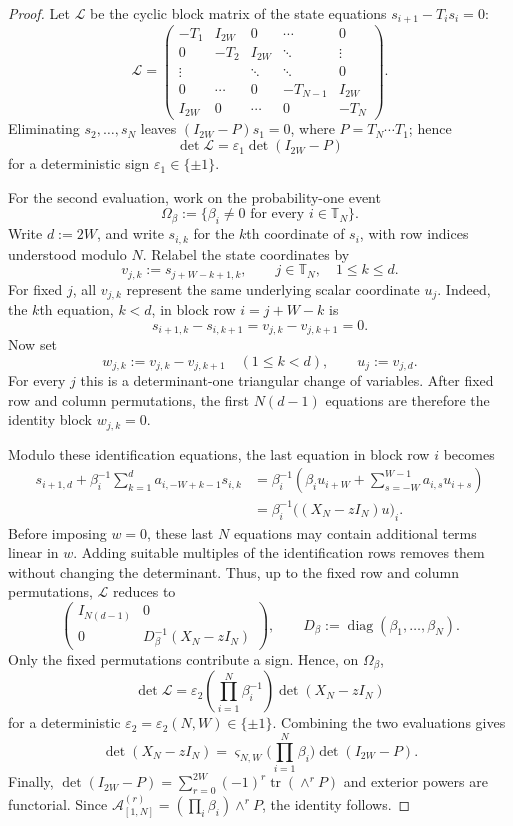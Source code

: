 \documentclass[11pt,reqno]{amsart}
\numberwithin{equation}{section}
\theoremstyle{definition}
\theoremstyle{remark}
\newcommand{\T}{\mathbb T}
\newcommand{\1}{\mathbf 1}
\DeclareMathOperator{\tr}{tr}
\begin{document}
\begin{proof}
Let $\mathscr L$ be the cyclic block matrix of the state equations
$s_{i+1}-T_is_i=0$:
\[
 \mathscr L=
 \begin{pmatrix}
 -T_1&I_{2W}&0&\cdots&0\\
 0&-T_2&I_{2W}&\ddots&\vdots\\
 \vdots&&\ddots&\ddots&0\\
 0&\cdots&0&-T_{N-1}&I_{2W}\\
 I_{2W}&0&\cdots&0&-T_N
 \end{pmatrix}.
\]
Eliminating $s_2,\ldots,s_N$ leaves
$(I_{2W}-P)s_1=0$, where $P=T_N\cdots T_1$; hence
\begin{equation}\label{eq:block-state-determinant}
 \det\mathscr L=\varepsilon_1\det(I_{2W}-P)
\end{equation}
for a deterministic sign $\varepsilon_1\in\{\pm 1\}$.

For the second evaluation, work on the probability-one event
\[
 \Omega_\beta:=\{\beta_i\ne0\text{ for every }i\in\T_N\}.
\]
Write $d:=2W$, and write $s_{i,k}$ for the $k$th coordinate of $s_i$, with
row indices understood modulo $N$.  Relabel the state coordinates by
\[
 v_{j,k}:=s_{j+W-k+1,k},
 \qquad j\in\T_N,\quad 1\le k\le d.
\]
For fixed $j$, all $v_{j,k}$ represent the same underlying scalar
coordinate $u_j$.  Indeed, the $k$th equation, $k<d$, in block row
$i=j+W-k$ is
\[
 s_{i+1,k}-s_{i,k+1}=v_{j,k}-v_{j,k+1}=0.
\]
Now set
\[
 w_{j,k}:=v_{j,k}-v_{j,k+1}\quad(1\le k<d),
 \qquad u_j:=v_{j,d}.
\]
For every $j$ this is a determinant-one triangular change of variables.
After fixed row and column permutations, the first $N(d-1)$ equations
are therefore the identity block $w_{j,k}=0$.

Modulo these identification equations, the last equation in block row
$i$ becomes
\begin{align*}
 s_{i+1,d}+\beta_i^{-1}\sum_{k=1}^d
     a_{i,-W+k-1}s_{i,k}
 &=\beta_i^{-1}\left(\beta_i u_{i+W}
     +\sum_{s=-W}^{W-1}a_{i,s}u_{i+s}\right)\\
 &=\beta_i^{-1}\bigl((X_N-zI_N)u\bigr)_i.
\end{align*}
Before imposing $w=0$, these last $N$ equations may contain additional
terms linear in $w$.  Adding suitable multiples of the identification
rows removes them without changing the determinant.  Thus, up to the
fixed row and column permutations, $\mathscr L$ reduces to
\[
 \begin{pmatrix}
  I_{N(d-1)}&0\\
  0&D_\beta^{-1}(X_N-zI_N)
 \end{pmatrix},
 \qquad D_\beta:=\operatorname{diag}(\beta_1,\ldots,\beta_N).
\]
Only the fixed permutations contribute a sign.  Hence, on $\Omega_\beta$,
\[
 \det\mathscr L=\varepsilon_2
 \left(\prod_{i=1}^N\beta_i^{-1}\right)\det(X_N-zI_N)
\]
for a deterministic $\varepsilon_2=\varepsilon_2(N,W)\in\{\pm1\}$.
Combining the two evaluations gives
\[
 \det(X_N-zI_N)=\varsigma_{N,W}\Big(\prod_{i=1}^N\beta_i\Big)
 \det(I_{2W}-P).
\]
Finally,
$\det(I_{2W}-P)=\sum_{r=0}^{2W}(-1)^r\tr(\wedge^rP)$ and exterior powers are
functorial.  Since
$\mathcal A_{[1,N]}^{(r)}=(\prod_i\beta_i)\wedge^rP$, the identity follows.
\end{proof}
\end{document}
